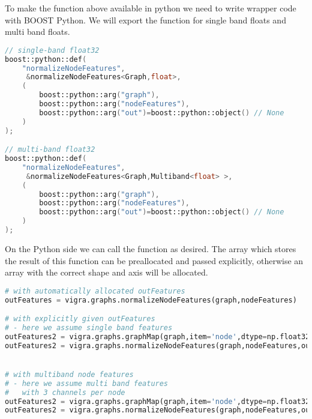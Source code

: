 \begin{minipage}{\textwidth}
To make the function above available in python
we need to write wrapper code with BOOST Python.
We will export the function for single band floats and multi band floats.

\begin{lstlisting}[language=c++]
// single-band float32
boost::python::def(
    "normalizeNodeFeatures",
     &normalizeNodeFeatures<Graph,float>,
    (
        boost::python::arg("graph"),
        boost::python::arg("nodeFeatures"),
        boost::python::arg("out")=boost::python::object() // None
    )
);

// multi-band float32
boost::python::def(
    "normalizeNodeFeatures",
     &normalizeNodeFeatures<Graph,Multiband<float> >,
    (
        boost::python::arg("graph"),
        boost::python::arg("nodeFeatures"),
        boost::python::arg("out")=boost::python::object() // None
    )
);
\end{lstlisting}

\end{minipage}


On the Python side we can call the function as desired.
The array which stores the result of this
function can be preallocated and passed explicitly,
otherwise an array with the correct shape and axis will be
allocated.


\begin{lstlisting}[language=Python]
# with automatically allocated outFeatures
outFeatures = vigra.graphs.normalizeNodeFeatures(graph,nodeFeatures)

# with explicitly given outFeatures
# - here we assume single band features
outFeatures2 = vigra.graphs.graphMap(graph,item='node',dtype=np.float32)
outFeatures2 = vigra.graphs.normalizeNodeFeatures(graph,nodeFeatures,out=outFeatures2)


# with multiband node features 
# - here we assume multi band features
#   with 3 channels per node
outFeatures2 = vigra.graphs.graphMap(graph,item='node',dtype=np.float32,channels=3)
outFeatures2 = vigra.graphs.normalizeNodeFeatures(graph,nodeFeatures,out=outFeatures2)
\end{lstlisting}

